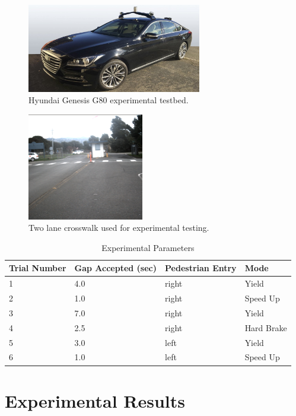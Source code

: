 \documentclass[letterpaper, 10 pt, conference]{ieeeconf} %
\begin{document}
\begin{figure}[h]
\centering
\includegraphics[width=3.0in]{figures/G80.jpg}
\caption{Hyundai Genesis G80 experimental testbed.}
\label{fig:g80}
\end{figure}

\begin{figure}[h]
\centering
\includegraphics[width=2.0in]{figures/crosswalkPic.png}
\caption{Two lane crosswalk used for experimental testing.}
\label{fig:crosswalkpic}
\end{figure}

\begin{table}[h]
\begin{center}
\caption{Experimental Parameters}\label{tb:expparams2}
\begin{tabular}{llll}
Trial Number & Gap Accepted (sec) & Pedestrian Entry & Mode\\\hline\hline
1 & 4.0 & right & Yield\\ 
2 & 1.0 & right & Speed Up\\ 
3 & 7.0 & right & Yield\\ 
4 & 2.5 & right & Hard Brake\\ 
5 & 3.0 & left & Yield \\ 
6 & 1.0 & left & Speed Up\\\hline
\end{tabular}
\end{center}
\end{table}

\section{Experimental Results}
\label{sec:expres}
\end{document}
